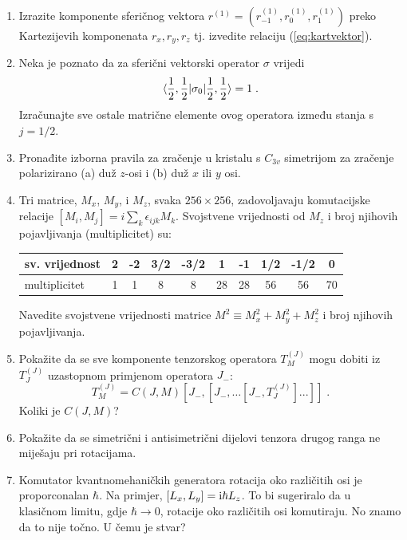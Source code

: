 \begin{enumerate}[label=\arabic{chapter}.\arabic*.]
\item
Izrazite komponente sferičnog vektora $r^{(1)} = (r^{(1)}_{-1}, r^{(1)}_{0},
r^{(1)}_{1})$ preko Kartezijevih komponenata $r_x, r_y, r_z$ tj. izvedite
relaciju (\ref{eq:kartvektor}).

\item Neka je poznato da za sferični vektorski operator $\sigma$ vrijedi
\[  \langle \frac{1}{2}, \frac{1}{2} | \sigma_0 | \frac{1}{2}, \frac{1}{2} \rangle = 1 \;. \]
Izračunajte sve ostale matrične elemente ovog operatora između stanja
s $j = 1/2$.

\item Pronađite izborna pravila za zračenje u kristalu s $C_{3v}$
simetrijom za zračenje polarizirano (a) duž $z$-osi i (b) duž
$x$ ili $y$ osi. 

\item 
Tri matrice, $M_x$, $M_y$, i $M_z$, svaka $256\times 256$, zadovoljavaju
komutacijske relacije $[M_i, M_j] = i \sum_{k} \epsilon_{ijk} M_k$.
Svojstvene vrijednosti od $M_z$ i broj njihovih pojavljivanja (multiplicitet) su:
\begin{center}
\begin{tabular}[h]{l|ccccccccc}
\hline
sv. vrijednost & 2 & -2 & 3/2 & -3/2 & 1 & -1 & 1/2 & -1/2 & 0 \\ \hline
multiplicitet & 1 & 1 & 8 & 8 & 28 & 28 & 56 & 56 & 70 \\ \hline
\end{tabular}
\end{center}
Navedite svojstvene vrijednosti matrice $M^2 \equiv M_{x}^2 + M_{y}^2 + M_{z}^2$
i broj njihovih pojavljivanja.

\item Pokažite da se sve komponente tenzorskog operatora 
$T^{(J)}_M$ mogu dobiti iz $T^{(J)}_J$ uzastopnom primjenom operatora $J_-$:
\[ T^{(J)}_M = C(J,M) [J_-, [J_-, \dots [J_-, T^{(J)}_J]. . .]] \;. \]
Koliki je $C(J,M)$?

\item \label{zad:antisim} Pokažite da se simetrični i antisimetrični
dijelovi tenzora drugog ranga ne miješaju pri rotacijama.

\item Komutator kvantnomehaničkih generatora rotacija oko različitih osi
    je proporconalan $\hbar$. Na primjer, $[L_x, L_y] = \textrm{i}\hbar L_z$. To
    bi sugeriralo da u klasičnom limitu, gdje $\hbar\to 0$, rotacije
    oko različitih osi komutiraju. No znamo da to nije točno.
    U čemu je stvar?

\end{enumerate}

